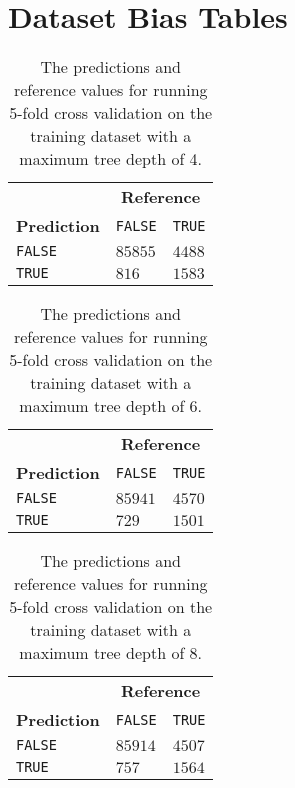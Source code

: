 \section{Dataset Bias Tables}
\label{app:confusion}

\begin{table}[H]
  \centering
  \begin{tabular}{l|ll}
    \multicolumn{1}{c|}{} & \multicolumn{2}{c}{\textbf{Reference}} \\
    \textbf{Prediction}   & \texttt{FALSE}       & \texttt{TRUE}   \\ \cline{2-3} 
    \texttt{FALSE}        & $85855$              & $4488$          \\
    \texttt{TRUE}         &   $816$              & $1583$           
  \end{tabular}
  \caption{The predictions and reference values for running 5-fold cross
    validation on the training dataset with a maximum tree depth of 4.}
  \label{app:tab:confusion1}
\end{table}

\begin{table}[H]
  \centering
  \begin{tabular}{l|ll}
    \multicolumn{1}{c|}{} & \multicolumn{2}{c}{\textbf{Reference}} \\
    \textbf{Prediction}   & \texttt{FALSE}       & \texttt{TRUE}   \\ \cline{2-3} 
    \texttt{FALSE}        & $85941$              & $4570$          \\
    \texttt{TRUE}         &   $729$              & $1501$           
  \end{tabular}
  \caption{The predictions and reference values for running 5-fold cross
    validation on the training dataset with a maximum tree depth of 6.}
  \label{app:tab:confusion2}
\end{table}

\begin{table}[H]
  \centering
  \begin{tabular}{l|ll}
    \multicolumn{1}{c|}{} & \multicolumn{2}{c}{\textbf{Reference}} \\
    \textbf{Prediction}   & \texttt{FALSE}       & \texttt{TRUE}   \\ \cline{2-3} 
    \texttt{FALSE}        & $85914$              & $4507$          \\
    \texttt{TRUE}         &   $757$              & $1564$           
  \end{tabular}
  \caption{The predictions and reference values for running 5-fold cross
    validation on the training dataset with a maximum tree depth of 8.}
  \label{app:tab:confusion3}
\end{table}

